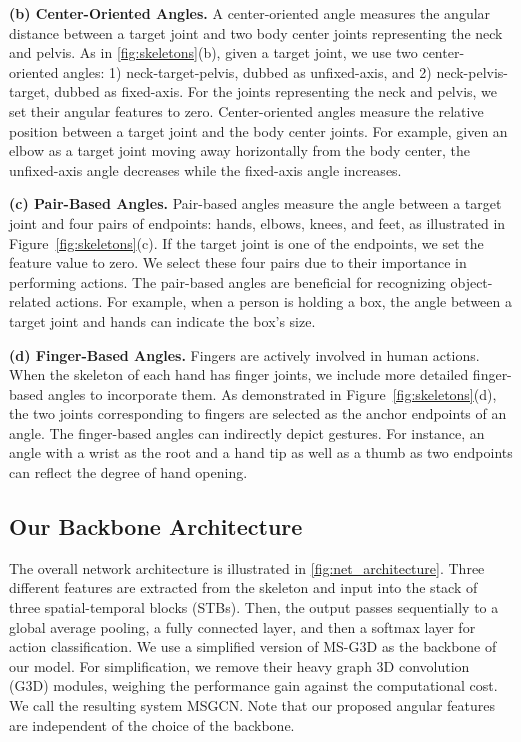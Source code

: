 \documentclass[journal,comsoc]{IEEEtran}
\def\ourmodel{MSGCN}
\begin{document}
\textbf{(b) Center-Oriented Angles.} A center-oriented angle measures the angular distance between a target joint and two body center joints representing the neck and pelvis. As in \autoref{fig:skeletons}(b), given a target joint, we use two center-oriented angles: 1) neck-target-pelvis, dubbed as unfixed-axis, and 2) neck-pelvis-target, dubbed as fixed-axis. For the joints representing the neck and pelvis, we set their angular features to zero.
Center-oriented angles measure the relative position between a target joint and the body center joints. For example, given an elbow as a target joint moving away horizontally from the body center, the unfixed-axis angle decreases while the fixed-axis angle increases. 

\textbf{(c) Pair-Based Angles.} Pair-based angles measure the angle between a target joint and four pairs of endpoints: hands, elbows, knees, and feet, as illustrated in Figure~\ref{fig:skeletons}(c).
If the target joint is one of the endpoints, we set the feature value to zero. We select these four pairs due to their importance in performing actions. The pair-based angles are beneficial for recognizing object-related actions. For example, when a person is holding a box, the angle between a target joint and hands can indicate the box's size.

\textbf{(d) Finger-Based Angles.} 
Fingers are actively involved in human actions.
When the skeleton of each hand has finger joints,
we include more detailed finger-based angles to incorporate them.
As demonstrated in Figure~\ref{fig:skeletons}(d), the two joints corresponding to fingers are selected as the anchor endpoints of an angle. The finger-based angles can indirectly depict gestures. For instance, 
an angle with a wrist as the root and a hand tip as well as a thumb as two endpoints can reflect the degree of hand opening. 

\subsection{Our Backbone Architecture}
\label{sec: angnet}
The overall network architecture is illustrated in \autoref{fig:net_architecture}. 
Three different features are extracted from the skeleton and input into the stack of three spatial-temporal blocks (STBs). Then, the output passes sequentially to a global average pooling, a fully connected layer, and then a softmax layer for action classification. We use a simplified version of MS-G3D \cite{liu2020disentangling} as the backbone of our model. 
For simplification, we remove their heavy graph 3D convolution (G3D) modules, weighing the performance gain against the computational cost. 
We call the resulting system \ourmodel{}. Note that our proposed angular features are independent of the choice of the backbone. 
\end{document}
